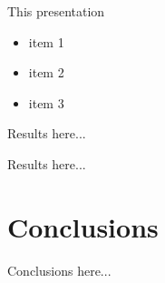\documentclass{beamer}
\begin{document}
\begin{frame}{This presentation}
	\begin{itemize}
		\item item 1
		\item item 2
		\item item 3
	\end{itemize}
\end{frame}

\begin{frame}
	Results here...
\end{frame}

\begin{frame}
	Results here...
\end{frame}

\section{Conclusions}

\begin{frame}
	Conclusions here...
\end{frame}
\end{document}
